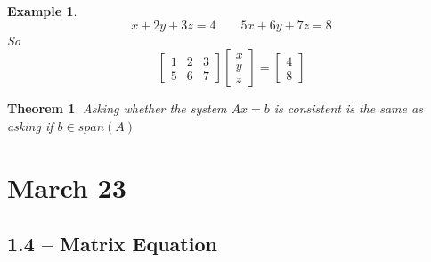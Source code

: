 \documentclass[11pt]{article}
\newtheorem{thm}{Theorem}
\newtheorem{ex}{Example}
\begin{document}
\begin{ex}
  \[x + 2y + 3z = 4 \qquad 5x + 6y + 7z = 8 \]
  So
  \[\begin{bmatrix} 1 & 2 & 3 \\ 5 & 6 & 7 \end{bmatrix} \begin{bmatrix} x \\ y \\ z \end{bmatrix} = \begin{bmatrix} 4 \\ 8 \end{bmatrix}\]
\end{ex}

\begin{thm}
  Asking whether the system $Ax = b$ is consistent is the same as asking if $b \in span(A)$
\end{thm}
\section{March 23}
\subsection{1.4 -- Matrix Equation}
\end{document}
